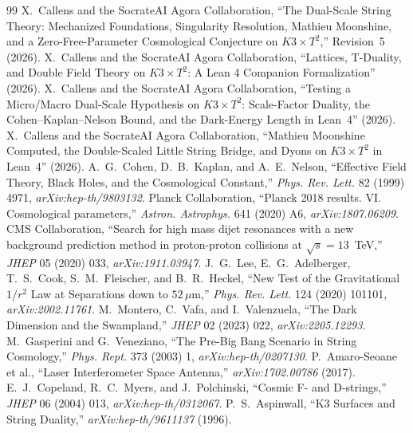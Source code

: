 \documentclass[11pt,a4paper]{article}
\theoremstyle{remark}
\begin{document}
\begin{thebibliography}{99}
 X.~Callens and the SocrateAI Agora Collaboration, ``The Dual-Scale String Theory: Mechanized Foundations, Singularity Resolution, Mathieu Moonshine, and a Zero-Free-Parameter Cosmological Conjecture on $K3\times T^2$,'' Revision~5 (2026).
 X.~Callens and the SocrateAI Agora Collaboration, ``Lattices, T-Duality, and Double Field Theory on $K3\times T^2$: A Lean 4 Companion Formalization'' (2026).
 X.~Callens and the SocrateAI Agora Collaboration, ``Testing a Micro/Macro Dual-Scale Hypothesis on $K3\times T^2$: Scale-Factor Duality, the Cohen--Kaplan--Nelson Bound, and the Dark-Energy Length in Lean~4'' (2026).
 X.~Callens and the SocrateAI Agora Collaboration, ``Mathieu Moonshine Computed, the Double-Scaled Little String Bridge, and Dyons on $K3\times T^2$ in Lean~4'' (2026).
 A.~G.~Cohen, D.~B.~Kaplan, and A.~E.~Nelson, ``Effective Field Theory, Black Holes, and the Cosmological Constant,'' \textit{Phys. Rev. Lett.} 82 (1999) 4971, \textit{arXiv:hep-th/9803132}.
 Planck Collaboration, ``Planck 2018 results. VI. Cosmological parameters,'' \textit{Astron. Astrophys.} 641 (2020) A6, \textit{arXiv:1807.06209}.
 CMS Collaboration, ``Search for high mass dijet resonances with a new background prediction method in proton-proton collisions at $\sqrt{s}=13$~TeV,'' \textit{JHEP} 05 (2020) 033, \textit{arXiv:1911.03947}.
 J.~G.~Lee, E.~G.~Adelberger, T.~S.~Cook, S.~M.~Fleischer, and B.~R.~Heckel, ``New Test of the Gravitational $1/r^2$ Law at Separations down to $52\,\mu$m,'' \textit{Phys. Rev. Lett.} 124 (2020) 101101, \textit{arXiv:2002.11761}.
 M.~Montero, C.~Vafa, and I.~Valenzuela, ``The Dark Dimension and the Swampland,'' \textit{JHEP} 02 (2023) 022, \textit{arXiv:2205.12293}.
 M.~Gasperini and G.~Veneziano, ``The Pre-Big Bang Scenario in String Cosmology,'' \textit{Phys. Rept.} 373 (2003) 1, \textit{arXiv:hep-th/0207130}.
 P.~Amaro-Seoane et al., ``Laser Interferometer Space Antenna,'' \textit{arXiv:1702.00786} (2017).
 E.~J.~Copeland, R.~C.~Myers, and J.~Polchinski, ``Cosmic F- and D-strings,'' \textit{JHEP} 06 (2004) 013, \textit{arXiv:hep-th/0312067}.
 P.~S.~Aspinwall, ``K3 Surfaces and String Duality,'' \textit{arXiv:hep-th/9611137} (1996).
\end{thebibliography}
\end{document}
